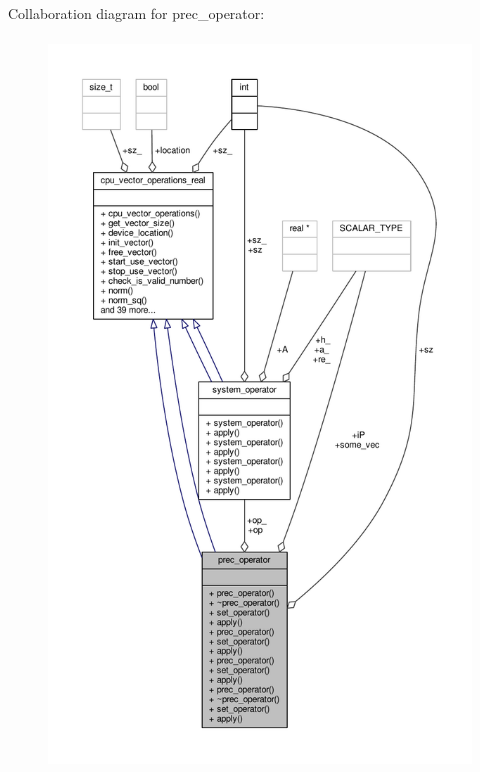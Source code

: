 Collaboration diagram for prec\-\_\-operator\-:\nopagebreak
\begin{figure}[H]
\begin{center}
\leavevmode
\includegraphics[height=550pt]{structprec__operator__coll__graph}
\end{center}
\end{figure}
